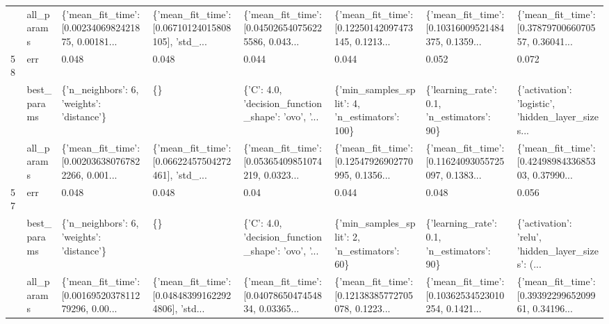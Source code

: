 \begin{tabular}{llllllll}
   & all\_params &  \{'mean\_fit\_time': [0.0023406982421875, 0.00181... &  \{'mean\_fit\_time': [0.06710124015808105], 'std\_... &  \{'mean\_fit\_time': [0.045026540756225586, 0.043... &  \{'mean\_fit\_time': [0.12250142097473145, 0.1213... &  \{'mean\_fit\_time': [0.10316009521484375, 0.1359... &  \{'mean\_fit\_time': [0.3787970066070557, 0.36041... \\
58 & err &                                              0.048 &                                              0.048 &                                              0.044 &                                              0.044 &                                              0.052 &                                              0.072 \\
   & best\_params &          \{'n\_neighbors': 6, 'weights': 'distance'\} &                                                 \{\} &  \{'C': 4.0, 'decision\_function\_shape': 'ovo', '... &      \{'min\_samples\_split': 4, 'n\_estimators': 100\} &         \{'learning\_rate': 0.1, 'n\_estimators': 90\} &  \{'activation': 'logistic', 'hidden\_layer\_sizes... \\
   & all\_params &  \{'mean\_fit\_time': [0.002036380767822266, 0.001... &  \{'mean\_fit\_time': [0.06622457504272461], 'std\_... &  \{'mean\_fit\_time': [0.05365409851074219, 0.0323... &  \{'mean\_fit\_time': [0.12547926902770995, 0.1356... &  \{'mean\_fit\_time': [0.11624093055725097, 0.1383... &  \{'mean\_fit\_time': [0.4249898433685303, 0.37990... \\
57 & err &                                              0.048 &                                              0.048 &                                               0.04 &                                              0.044 &                                              0.048 &                                              0.056 \\
   & best\_params &          \{'n\_neighbors': 6, 'weights': 'distance'\} &                                                 \{\} &  \{'C': 4.0, 'decision\_function\_shape': 'ovo', '... &       \{'min\_samples\_split': 2, 'n\_estimators': 60\} &         \{'learning\_rate': 0.1, 'n\_estimators': 90\} &  \{'activation': 'relu', 'hidden\_layer\_sizes': (... \\
   & all\_params &  \{'mean\_fit\_time': [0.0016952037811279296, 0.00... &  \{'mean\_fit\_time': [0.048483991622924806], 'std... &  \{'mean\_fit\_time': [0.0407865047454834, 0.03365... &  \{'mean\_fit\_time': [0.12138385772705078, 0.1223... &  \{'mean\_fit\_time': [0.10362534523010254, 0.1421... &  \{'mean\_fit\_time': [0.3939229965209961, 0.34196... \\

\end{tabular}
